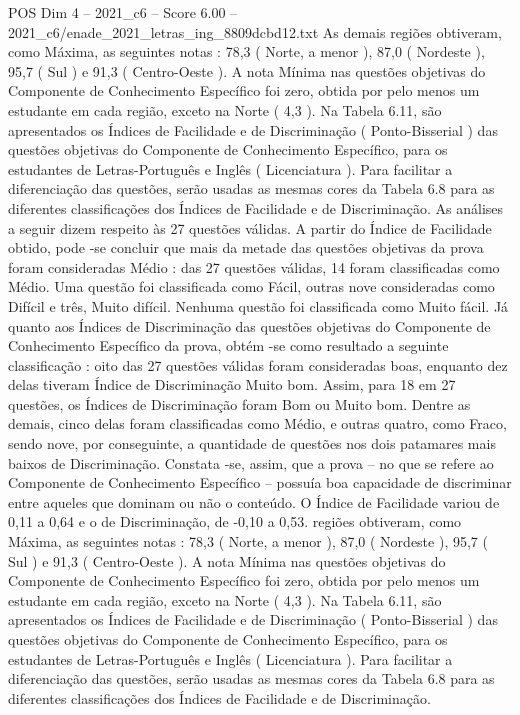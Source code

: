 \begin{textsample}{POS Dim 4 – 2021\_c6 – Score 6.00 – 2021\_c6/enade\_2021\_letras\_ing\_8809dcbd12.txt}
As demais regiões obtiveram, como Máxima, as seguintes notas : 78,3 ( Norte, a menor ), 87,0 ( Nordeste ), 95,7 ( Sul ) e 91,3 ( Centro-Oeste ).
A nota Mínima nas questões objetivas do Componente de Conhecimento Específico foi zero, obtida por pelo menos um estudante em cada região, exceto na Norte ( 4,3 ).
Na Tabela 6.11, são apresentados os Índices de Facilidade e de Discriminação ( Ponto-Bisserial ) das questões objetivas do Componente de Conhecimento Específico, para os estudantes de Letras-Português e Inglês ( Licenciatura ).
Para facilitar a diferenciação das questões, serão usadas as mesmas cores da Tabela 6.8 para as diferentes classificações dos Índices de Facilidade e de Discriminação.
As análises a seguir dizem respeito às 27 questões válidas.
A partir do Índice de Facilidade obtido, pode -se concluir que mais da metade das questões objetivas da prova foram consideradas Médio : das 27 questões válidas, 14 foram classificadas como Médio.
Uma questão foi classificada como Fácil, outras nove consideradas como Difícil e três, Muito difícil.
Nenhuma questão foi classificada como Muito fácil.
Já quanto aos Índices de Discriminação das questões objetivas do Componente de Conhecimento Específico da prova, obtém -se como resultado a seguinte classificação : oito das 27 questões válidas foram consideradas boas, enquanto dez delas tiveram Índice de Discriminação Muito bom.
Assim, para 18 em 27 questões, os Índices de Discriminação foram Bom ou Muito bom.
Dentre as demais, cinco delas foram classificadas como Médio, e outras quatro, como Fraco, sendo nove, por conseguinte, a quantidade de questões nos dois patamares mais baixos de Discriminação.
Constata -se, assim, que a prova – no que se refere ao Componente de Conhecimento Específico – possuía boa capacidade de discriminar entre aqueles que dominam ou não o conteúdo.
O Índice de Facilidade variou de 0,11 a 0,64 e o de Discriminação, de -0,10 a 0,53. regiões obtiveram, como Máxima, as seguintes notas : 78,3 ( Norte, a menor ), 87,0 ( Nordeste ), 95,7 ( Sul ) e 91,3 ( Centro-Oeste ).
A nota Mínima nas questões objetivas do Componente de Conhecimento Específico foi zero, obtida por pelo menos um estudante em cada região, exceto na Norte ( 4,3 ).
Na Tabela 6.11, são apresentados os Índices de Facilidade e de Discriminação ( Ponto-Bisserial ) das questões objetivas do Componente de Conhecimento Específico, para os estudantes de Letras-Português e Inglês ( Licenciatura ).
Para facilitar a diferenciação das questões, serão usadas as mesmas cores da Tabela 6.8 para as diferentes classificações dos Índices de Facilidade e de Discriminação.

\end{textsample}

